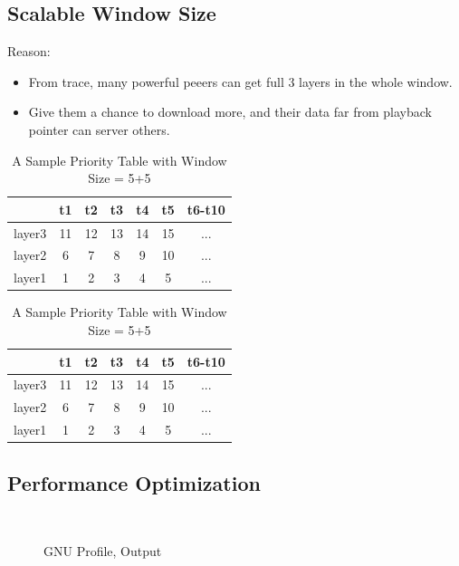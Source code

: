 \documentclass[11pt,a4paper]{article}
\begin{document}
\subsection{Scalable Window Size}

Reason:
\begin{itemize}
	\item From trace, many powerful peeers can get full 3 layers
	in the whole window. 
	\item Give them a chance to download more, and their data
	far from playback pointer can server others. 
\end{itemize}
\begin{table}
\caption{A Sample Priority Table with Window Size = 5+5}
	\begin{tabular}{|c|ccccc|c|}
	\hline
	 & t1 & t2 & t3 & t4 & t5 & t6-t10 \\
	 \hline
	layer3 & 11 & 12 & 13 & 14 & 15 & ...\\
	layer2 & 6 & 7 & 8 & 9 & 10 & ... \\
	layer1 & 1 & 2 & 3 & 4 & 5  & ...\\
	\hline
	\end{tabular}
\end{table}

\begin{table}
\caption{A Sample Priority Table with Window Size = 5+5}
	\begin{tabular}{|c|ccccc|c|}
	\hline
	 & t1 & t2 & t3 & t4 & t5 & t6-t10 \\
	 \hline
	layer3 & 11 & 12 & 13 & 14 & 15 & ...\\
	layer2 & 6 & 7 & 8 & 9 & 10 & ... \\
	layer1 & 1 & 2 & 3 & 4 & 5  & ...\\
	\hline
	\end{tabular}
\end{table}

\subsection{Performance Optimization}

\begin{figure}
	 \\
	\caption{GNU Profile, Output}
\end{figure}
\end{document}
